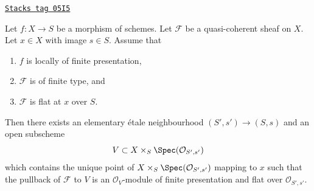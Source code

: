 \begin{proposition}
\label{flat-proposition-finite-type-flat-at-point}
\href{https://stacks.math.columbia.edu/tag/05I5}{\texttt{Stacks tag 05I5}}

Let $f : X \to S$ be a morphism of schemes.
Let $\mathcal{F}$ be a quasi-coherent sheaf on $X$.
Let $x \in X$ with image $s \in S$.
Assume that
\begin{enumerate}
\item $f$ is locally of finite presentation,
\item $\mathcal{F}$ is of finite type, and
\item $\mathcal{F}$ is flat at $x$ over $S$.
\end{enumerate}
Then there exists an elementary \'etale neighbourhood $(S', s') \to (S, s)$
and an open subscheme
$$
V \subset X \times_S \Spec(\mathcal{O}_{S', s'})
$$
which contains the unique point of
$X \times_S \Spec(\mathcal{O}_{S', s'})$ mapping to $x$
such that the pullback of $\mathcal{F}$ to $V$ is an $\mathcal{O}_V$-module
of finite presentation and flat over $\mathcal{O}_{S', s'}$.
\end{proposition}

